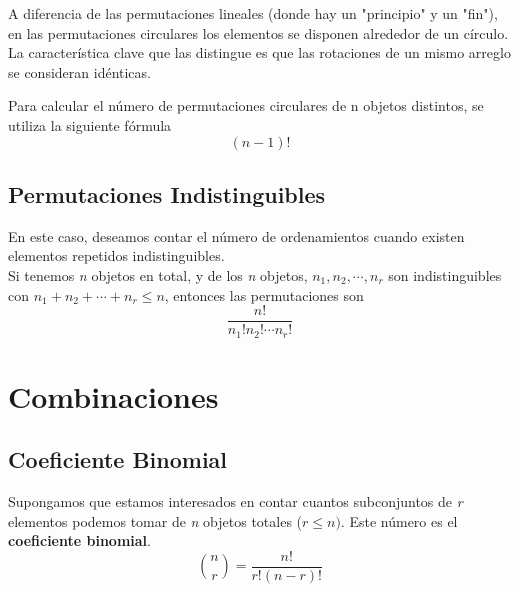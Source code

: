 A diferencia de las permutaciones lineales (donde hay un "principio" y un "fin"), en las permutaciones circulares los elementos se disponen alrededor de un círculo. La característica clave que las distingue es que las rotaciones de un mismo arreglo se consideran idénticas.

Para calcular el número de permutaciones circulares de n objetos distintos, se utiliza la siguiente fórmula
\[(n - 1)!\]


\subsection{Permutaciones Indistinguibles}
En este caso, deseamos contar el número de ordenamientos cuando existen elementos repetidos indistinguibles.\\
Si tenemos \textit{n} objetos en total, y de los \textit{n} objetos, $n_1,n_2, \cdots, n_r$ son indistinguibles con $n_1 + n_2 + \cdots + n_r \le n$, entonces las permutaciones son
\[\frac{n!}{n_1!n_2!\cdots n_r!}\]


\section{Combinaciones}

\subsection{Coeficiente Binomial}

Supongamos que estamos interesados en contar cuantos subconjuntos de \textit{r} elementos podemos tomar de \textit{n} objetos totales ($r \le n)$. Este número es el \textbf{coeficiente binomial}.
\[\binom{n}{r} = \frac{n!}{r!(n - r)!}\]


